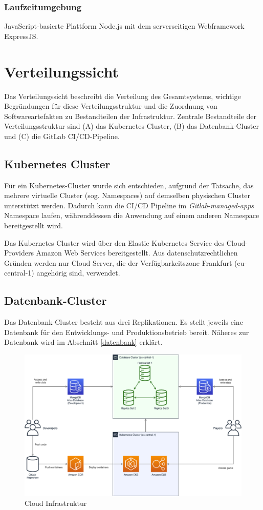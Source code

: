 \documentclass[letterpaper, 10 pt, conference]{ieeeconf}
\begin{document}
\subsubsection{Laufzeitumgebung}

JavaScript-basierte Plattform Node.js mit dem serverseitigen Webframework ExpressJS.

\section{Verteilungssicht}
Das Verteilungssicht beschreibt die Verteilung des Gesamtsystems,  wichtige Begründungen für diese Verteilungsstruktur und die Zuordnung von Softwareartefakten zu Bestandteilen der Infrastruktur.
Zentrale Bestandteile der Verteilungsstruktur sind (A) das Kubernetes Cluster,  (B) das Datenbank-Cluster und (C) die GitLab CI/CD-Pipeline.

\subsection{Kubernetes Cluster}

Für ein Kubernetes-Cluster wurde sich entschieden, aufgrund der Tatsache, das mehrere virtuelle Cluster (sog. Namespaces) auf demselben physischen Cluster unterstützt werden. Dadurch kann die CI/CD Pipeline im \textit{Gitlab-managed-apps} Namespace laufen, währenddessen die Anwendung auf einem anderen Namespace bereitgestellt wird.

Das Kubernetes Cluster wird über den Elastic Kubernetes Service des Cloud-Providers Amazon Web Services bereitgestellt.  Aus datenschutzrechtlichen Gründen werden nur Cloud Server, die der Verfügbarkeitszone Frankfurt (eu-central-1) angehörig sind, verwendet.

\subsection{Datenbank-Cluster}
Das Datenbank-Cluster besteht aus drei Replikationen. Es stellt jeweils eine Datenbank für den Entwicklungs- und Produktionsbetrieb bereit. Näheres zur Datenbank wird im Abschnitt \ref{datenbank} erklärt.

\begin{figure}[thpb]
      \centering
      \includegraphics[scale=0.22]{images/infrastructure}
      \caption{Cloud Infrastruktur}
      \label{fig:infrastructure}
\end{figure}
\end{document}

